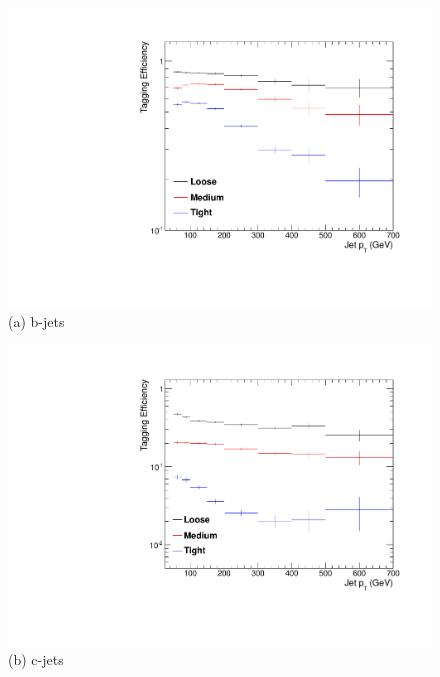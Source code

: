 \begin{figure}[ht]
\centering
\begin{minipage}[b]{0.48\linewidth}
\includegraphics[width = 1.0\linewidth]{plots/bjet_PtDistribution_Htbin_Template_375.pdf}
\centering (a)  b-jets
\end{minipage}
\quad
\begin{minipage}[b]{0.48\linewidth}
\includegraphics[width = 1.0\linewidth]{plots/cjet_PtDistribution_Htbin_Template_375.pdf}
\centering (b) c-jets
\end{minipage}
\quad
\begin{minipage}[b]{0.48\linewidth}
\centering

\end{minipage}
\end{figure}
